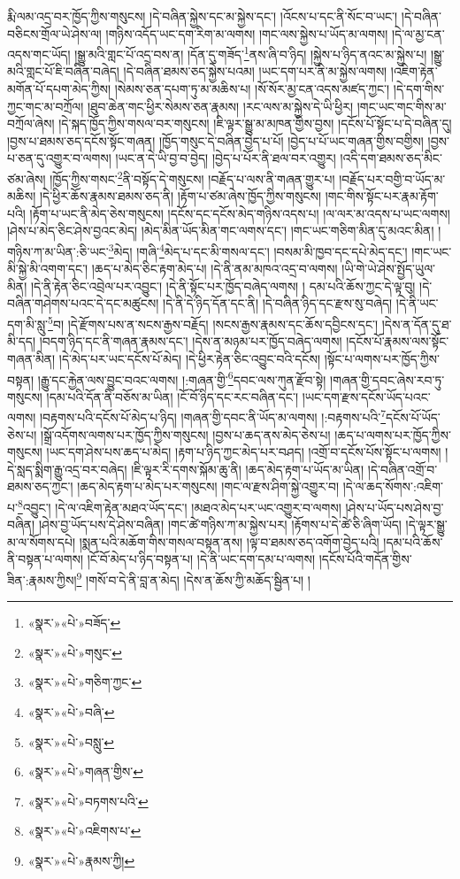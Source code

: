 རྨི་ལམ་འདྲ་བར་ཁྱོད་ཀྱིས་གསུངས། །དེ་བཞིན་སྐྱེས་དང་མ་སྐྱེས་དང་། །འོངས་པ་དང་ནི་སོང་བ་ཡང་། །དེ་བཞིན་བཅིངས་གྲོལ་ཡེ་ཤེས་ལ། །གཉིས་འདོད་ཡང་དག་རིག་མ་ལགས། །གང་ལས་སྐྱེས་པ་ཡོད་མ་ལགས། །དེ་ལ་མྱ་ངན་འདས་གང་ཡོད། །སྒྱུ་མའི་གླང་པོ་འདྲ་བས་ན། །དོན་དུ་གཟོད་\footnote{«སྣར་»«པེ་»བཟོད་}ནས་ཞི་བ་ཉིད། །སྐྱེས་པ་ཉིད་ནའང་མ་སྐྱེས་པ། །སྒྱུ་མའི་གླང་པོ་ཇི་བཞིན་བཞེད། །དེ་བཞིན་ཐམས་ཅད་སྐྱེས་པའམ། །ཡང་དག་པར་ནི་མ་སྐྱེས་ལགས། །འཇིག་རྟེན་མགོན་པོ་དཔག་མེད་ཀྱིས། །སེམས་ཅན་དཔག་ཏུ་མ་མཆིས་པ། །སོ་སོར་མྱ་ངན་འདས་མཛད་ཀྱང་། །དེ་དག་གིས་ཀྱང་གང་མ་བཀྲོལ། །ཐུབ་ཆེན་གང་ཕྱིར་སེམས་ཅན་རྣམས། །རང་ལས་མ་སྐྱེས་དེ་ཡི་ཕྱིར། །གང་ཡང་གང་གིས་མ་བཀྲོལ་ཞེས། །དེ་སྐད་ཁྱོད་ཀྱིས་གསལ་བར་གསུངས། །ཇི་ལྟར་སྒྱུ་མ་མཁན་གྱིས་བྱས། །དངོས་པོ་སྟོང་པ་དེ་བཞིན་དུ། །བྱས་པ་ཐམས་ཅད་དངོས་སྟོང་གཞན། །ཁྱོད་གསུང་དེ་བཞིན་བྱེད་པ་པོ། །བྱེད་པ་པོ་ཡང་གཞན་གྱིས་བགྱིས། །བྱས་པ་ཅན་དུ་འགྱུར་བ་ལགས། །ཡང་ན་དེ་ཡི་བྱ་བ་བྱེད། །བྱེད་པ་པོར་ནི་ཐལ་བར་འགྱུར། །འདི་དག་ཐམས་ཅད་མིང་ཙམ་ཞེས། །ཁྱོད་ཀྱིས་གསང་\footnote{«སྣར་»«པེ་»གསུང་}ནི་བསྟོད་དེ་གསུངས། །བརྗོད་པ་ལས་ནི་གཞན་གྱུར་པ། །བརྗོད་པར་བགྱི་བ་ཡོད་མ་མཆིས། །དེ་ཕྱིར་ཆོས་རྣམས་ཐམས་ཅད་ནི། །རྟོག་པ་ཙམ་ཞེས་ཁྱོད་ཀྱིས་གསུངས། །གང་གིས་སྟོང་པར་རྣམ་རྟོག་པའི། །རྟོག་པ་ཡང་ནི་མེད་ཅེས་གསུངས། །དངོས་དང་དངོས་མེད་གཉིས་འདས་པ། །ལ་ལར་མ་འདས་པ་ཡང་ལགས། །ཤེས་པ་མེད་ཅིང་ཤེས་བྱའང་མེད། །མེད་མིན་ཡོད་མིན་གང་ལགས་དང་། །གང་ཡང་གཅིག་མིན་དུ་མའང་མིན། །གཉིས་ཀ་མ་ཡིན་:ཅི་ཡང་\footnote{«སྣར་»«པེ་»གཅིག་ཀྱང་}མེད། །གཞི་\footnote{«སྣར་»«པེ་»བཞི་}མེད་པ་དང་མི་གསལ་དང་། །བསམ་མི་ཁྱབ་དང་དཔེ་མེད་དང་། །གང་ཡང་མི་སྐྱེ་མི་འགག་དང་། །ཆད་པ་མེད་ཅིང་རྟག་མེད་པ། །དེ་ནི་ནམ་མཁའ་འདྲ་བ་ལགས། །ཡི་གེ་ཡེ་ཤེས་སྤྱོད་ཡུལ་མིན། །དེ་ནི་རྟེན་ཅིང་འབྲེལ་པར་འབྱུང་། །དེ་ནི་སྟོང་པར་ཁྱོད་བཞེད་ལགས། །
དམ་པའི་ཆོས་ཀྱང་དེ་ལྟ་བུ། །དེ་བཞིན་གཤེགས་པའང་དེ་དང་མཚུངས། །དེ་ནི་དེ་ཉིད་དོན་དང་ནི། །དེ་བཞིན་ཉིད་དང་རྫས་སུ་བཞེད། །དེ་ནི་ཡང་དག་མི་སླུ་\footnote{«སྣར་»«པེ་»བསླུ་}བ། །དེ་རྫོགས་པས་ན་སངས་རྒྱས་བརྗོད། །སངས་རྒྱས་རྣམས་དང་ཆོས་དབྱིངས་དང་། །དེས་ན་དོན་དུ་ཐ་མི་དད། །བདག་ཉིད་དང་ནི་གཞན་རྣམས་དང་། །དེས་ན་མཉམ་པར་ཁྱོད་བཞེད་ལགས། །དངོས་པོ་རྣམས་ལས་སྟོང་གཞན་མིན། །དེ་མེད་པར་ཡང་དངོས་པོ་མེད། །དེ་ཕྱིར་རྟེན་ཅིང་འབྱུང་བའི་དངོས། །སྟོང་པ་ལགས་པར་ཁྱོད་ཀྱིས་བསྟན། །རྒྱུ་དང་རྐྱེན་ལས་བྱུང་བའང་ལགས། །:གཞན་གྱི་\footnote{«སྣར་»«པེ་»གཞན་གྱིས་}དབང་ལས་ཀུན་རྫོབ་སྟེ། །གཞན་གྱི་དབང་ཞེས་རབ་ཏུ་གསུངས། །དམ་པའི་དོན་ནི་བཅོས་མ་ཡིན། །ངོ་བོ་ཉིད་དང་རང་བཞིན་དང་། །ཡང་དག་རྫས་དངོས་ཡོད་པའང་ལགས། །བརྟགས་པའི་དངོས་པོ་མེད་པ་ཉིད། །གཞན་གྱི་དབང་ནི་ཡོད་མ་ལགས། །:བརྟགས་པའི་\footnote{«སྣར་»«པེ་»བཏགས་པའི་}དངོས་པོ་ཡོད་ཅེས་པ། །སྒྲོ་འདོགས་ལགས་པར་ཁྱོད་ཀྱིས་གསུངས། །བྱས་པ་ཆད་ནས་མེད་ཅེས་པ། །ཆད་པ་ལགས་པར་ཁྱོད་ཀྱིས་གསུངས། །ཡང་དག་ཤེས་པས་ཆད་པ་མེད། །རྟག་པ་ཉིད་ཀྱང་མེད་པར་བཤད། །འགྲོ་བ་དངོས་པོས་སྟོང་པ་ལགས། །དེ་སླད་སྨིག་རྒྱུ་འདྲ་བར་བཞེད། །ཇི་ལྟར་རི་དགས་སྐོམ་ཆུ་ནི། །ཆད་མེད་རྟག་པ་ཡོད་མ་ཡིན། །དེ་བཞིན་འགྲོ་བ་ཐམས་ཅད་ཀྱང་། །ཆད་མེད་རྟག་པ་མེད་པར་གསུངས། །གང་ལ་རྫས་ཤིག་སྐྱེ་འགྱུར་བ། །དེ་ལ་ཆད་སོགས་:འཇིག་པ་\footnote{«སྣར་»«པེ་»འཇིགས་པ་}འབྱུང་། །དེ་ལ་འཇིག་རྟེན་མཐའ་ཡོད་དང་། །མཐའ་མེད་པར་ཡང་འགྱུར་བ་ལགས། །ཤེས་པ་ཡོད་པས་ཤེས་བྱ་བཞིན། །ཤེས་བྱ་ཡོད་པས་དེ་ཤེས་བཞིན། །གང་ཚེ་གཉིས་ཀ་མ་སྐྱེས་པར། །རྟོགས་པ་དེ་ཚེ་ཅི་ཞིག་ཡོད། །དེ་ལྟར་སྒྱུ་མ་ལ་སོགས་དཔེ། །སྨན་པའི་མཆོག་གིས་གསལ་བསྟན་ནས། །ལྟ་བ་ཐམས་ཅད་འགོག་བྱེད་པའི། །དམ་པའི་ཆོས་ནི་བསྟན་པ་ལགས། །ངོ་བོ་མེད་པ་ཉིད་བསྟན་པ། །དེ་ནི་ཡང་དག་དམ་པ་ལགས། །དངོས་པོའི་གདོན་གྱིས་ཟིན་:རྣམས་ཀྱིས།\footnote{«སྣར་»«པེ་»རྣམས་ཀྱི།} །གསོ་བ་དེ་ནི་བླ་ན་མེད། །དེས་ན་ཆོས་ཀྱི་མཆོད་སྦྱིན་པ། །
